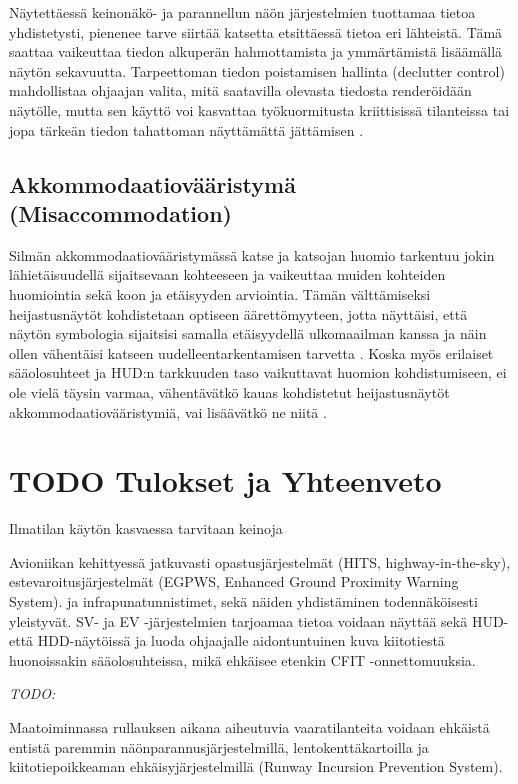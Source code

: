 \documentclass[utf8,bachelor,manualbib]{gradu3}
\begin{document}
Näytettäessä keinonäkö- ja parannellun näön järjestelmien tuottamaa tietoa yhdistetysti, pienenee tarve siirtää katsetta etsittäessä tietoa eri lähteistä. Tämä saattaa vaikeuttaa tiedon alkuperän hahmottamista ja ymmärtämistä lisäämällä näytön sekavuutta. Tarpeettoman tiedon poistamisen hallinta (declutter control) mahdollistaa ohjaajan valita, mitä saatavilla olevasta tiedosta renderöidään näytölle, mutta sen käyttö voi kasvattaa työkuormitusta kriittisissä tilanteissa tai jopa tärkeän tiedon tahattoman näyttämättä jättämisen \citep{baileyym2007}.

\section{Akkommodaatiovääristymä (Misaccommodation)}

Silmän akkommodaatiovääristymässä katse ja katsojan huomio tarkentuu jokin lähietäisuudellä sijaitsevaan kohteeseen ja vaikeuttaa muiden kohteiden huomiointia sekä koon ja etäisyyden arviointia. Tämän välttämiseksi heijastusnäytöt kohdistetaan optiseen äärettömyyteen, jotta näyttäisi, että näytön symbologia sijaitsisi samalla etäisyydellä ulkomaailman kanssa ja näin ollen vähentäisi katseen uudelleentarkentamisen tarvetta \citep{naish1964}. Koska myös erilaiset sääolosuhteet ja HUD:n tarkkuuden taso vaikuttavat huomion kohdistumiseen, ei ole vielä täysin varmaa, vähentävätkö kauas kohdistetut heijastusnäytöt akkommodaatiovääristymiä, vai lisäävätkö ne niitä \citep{crawfordneal2006}.

\chapter{TODO Tulokset ja Yhteenveto}

Ilmatilan käytön kasvaessa tarvitaan keinoja 

Avioniikan kehittyessä jatkuvasti opastusjärjestelmät (HITS, highway-in-the-sky), estevaroitusjärjestelmät (EGPWS, Enhanced Ground Proximity Warning System). ja infrapunatunnistimet, sekä näiden yhdistäminen todennäköisesti yleistyvät. SV- ja EV -järjestelmien tarjoamaa tietoa voidaan näyttää sekä HUD- että HDD-näytöissä ja luoda ohjaajalle aidontuntuinen kuva kiitotiestä huonoissakin sääolosuhteissa, mikä ehkäisee etenkin CFIT -onnettomuuksia.

\emph{TODO:}

Maatoiminnassa rullauksen aikana aiheutuvia vaaratilanteita voidaan ehkäistä entistä paremmin näönparannusjärjestelmillä, lentokenttäkartoilla ja kiitotiepoikkeaman ehkäisyjärjestelmillä (Runway Incursion Prevention System).
\end{document}
